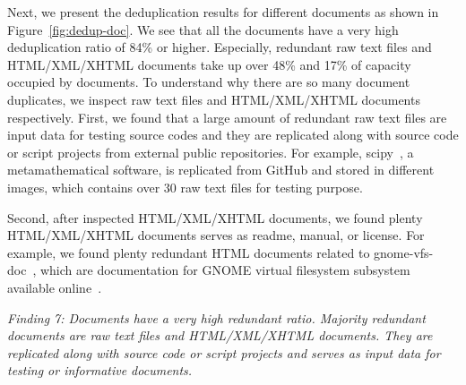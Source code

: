 Next, we present the deduplication results for different documents as shown in Figure~\ref{fig:dedup-doc}. 
We see that all the documents have a very high deduplication ratio of 84\% or higher.
Especially, redundant raw text files and HTML/XML/XHTML documents take up over 48\% and 17\% of capacity occupied by documents. To understand why there are so many document duplicates, we inspect raw text files and HTML/XML/XHTML documents respectively. First, we found that a large amount of redundant raw text files are input data for testing source codes and 
they are replicated along with source code or script projects from external public repositories. 
For example, scipy~\cite{xxx}, a metamathematical software, is replicated from GitHub and stored in different images, which contains over 30 raw text files for testing purpose.

Second, after inspected HTML/XML/XHTML documents, we found plenty HTML/XML/XHTML documents serves as readme, manual, or license. For example, we found plenty redundant HTML documents related to  gnome-vfs-doc~\cite{xxx}, which are documentation for GNOME virtual filesystem subsystem available online~\cite{xxx}.

\textit{Finding 7: Documents have a very high redundant ratio. Majority redundant documents are raw text files and HTML/XML/XHTML documents. They are replicated along with source code or script projects and serves as input data for testing or informative documents.}


%


